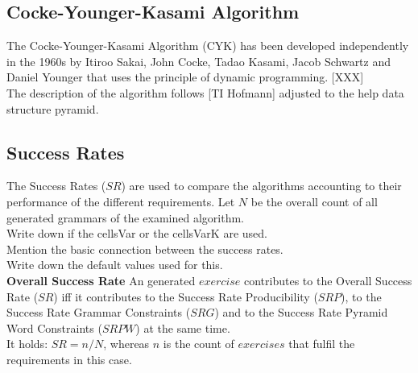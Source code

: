 \subsection{ Cocke-Younger-Kasami Algorithm}
The Cocke-Younger-Kasami Algorithm (CYK) has been developed independently in the 1960s by Itiroo Sakai, John Cocke, Tadao Kasami, Jacob Schwartz and Daniel Younger that uses the principle of dynamic programming. [XXX]\\
The description of the algorithm follows [TI Hofmann] adjusted to the help data structure pyramid. \\

\noindent {}

\subsection{Success Rates}
\noindent The Success Rates ($SR$) are used to compare the algorithms accounting to their performance of the different requirements. Let $N$ be the overall count of all generated grammars of the examined algorithm.\\

\noindent Write down if the cellsVar or the cellsVarK are used.\\
Mention the basic connection between the success rates.\\
Write down the default values used for this.\\


\noindent\textbf{Overall Success Rate}
An generated $exercise$ contributes to the Overall Success Rate ($SR$) iff it contributes to the Success Rate Producibility ($SRP$), to the Success Rate Grammar Constraints ($SRG$) and to the Success Rate Pyramid Word Constraints ($SRPW$) at the same time.\\
It holds: $SR = n / N$, whereas $n$ is the count of $exercises$ that fulfil the requirements in this case.\\

